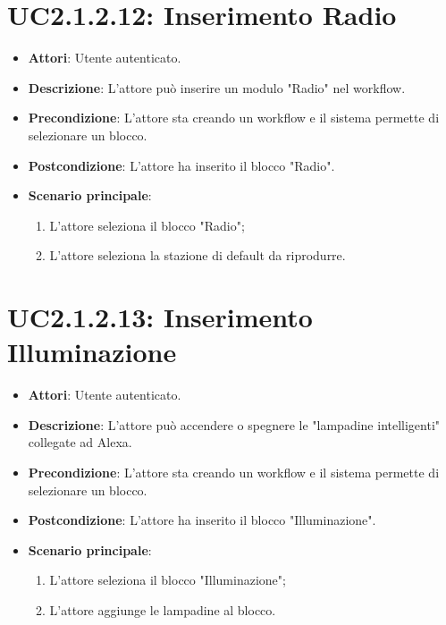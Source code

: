 \section{UC2.1.2.12: Inserimento Radio}
\label{UC2.1.2.12}
\begin{itemize}
	\item \textbf{Attori}: Utente autenticato.
	\item \textbf{Descrizione}: L'attore può inserire un modulo "Radio" nel workflow.
	\item \textbf{Precondizione}: L'attore sta creando un workflow e il sistema permette di selezionare un blocco.
	\item \textbf{Postcondizione}: L'attore ha inserito il blocco "Radio".
	\item \textbf{Scenario principale}:
	\begin{enumerate} \item L'attore seleziona il blocco "Radio";  \item  L'attore seleziona la stazione di default da riprodurre.\end{enumerate}
\end{itemize}

\section{UC2.1.2.13: Inserimento Illuminazione}
\label{UC2.1.2.13}
\begin{itemize}
	\item \textbf{Attori}: Utente autenticato.
	\item \textbf{Descrizione}: L'attore può accendere o spegnere le "lampadine intelligenti" collegate ad Alexa.
	\item \textbf{Precondizione}: L'attore sta creando un workflow e il sistema permette di selezionare un blocco.
	\item \textbf{Postcondizione}: L'attore ha inserito il blocco "Illuminazione".
	\item \textbf{Scenario principale}:
	\begin{enumerate} \item L'attore seleziona il blocco "Illuminazione";  \item  L'attore aggiunge le lampadine al blocco.\end{enumerate}
\end{itemize}

